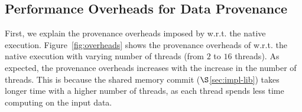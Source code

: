 



\subsection{Performance Overheads for Data Provenance}
\label{subsec:overheads}
First, we explain the provenance overheads imposed by \projecttitle w.r.t. the native \pthreads execution. Figure~\ref{fig:overheads} shows the provenance overheads of \projecttitle w.r.t. the native \pthreads execution with varying number of
threads (from $2$ to $16$ threads). As expected, the provenance overheads increases with the increase in the number of threads. This is because the shared memory commit ($\S$\ref{sec:impl-lib}) takes longer time with a higher number of threads, as each thread spends less time computing on the input data.  



